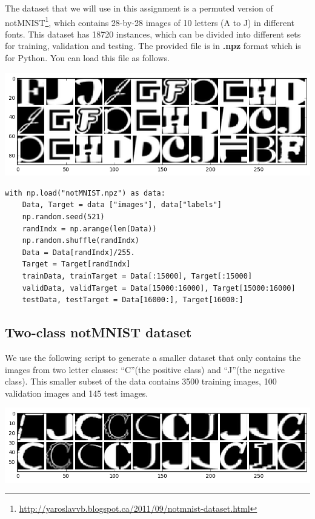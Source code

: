 \documentclass[12pt,letterpaper]{article}
\begin{document}
The dataset that we will use in this assignment is a permuted version of notMNIST\footnote{\url{http://yaroslavvb.blogspot.ca/2011/09/notmnist-dataset.html}}, which contains 28-by-28 images of 10 letters (A to J) in  different fonts. This dataset has 18720 instances, which can be divided into different sets for training, validation and testing. The provided file is in \textbf{.npz} format which is for Python. You can load this file as follows.

\includegraphics[scale=0.6]{multiclass.png}

\begin{verbatim}
with np.load("notMNIST.npz") as data:
    Data, Target = data ["images"], data["labels"]
    np.random.seed(521)
    randIndx = np.arange(len(Data))
    np.random.shuffle(randIndx)
    Data = Data[randIndx]/255.
    Target = Target[randIndx]
    trainData, trainTarget = Data[:15000], Target[:15000]
    validData, validTarget = Data[15000:16000], Target[15000:16000]
    testData, testTarget = Data[16000:], Target[16000:]
\end{verbatim}

\subsection*{Two-class notMNIST dataset}
We use the following script to generate a smaller dataset that only contains the images from two letter classes: ``C''(the positive class) and ``J''(the negative class). This smaller subset of the data contains 3500 training images, 100 validation images and 145 test images.

\includegraphics[scale=0.6]{binary.png}
\end{document}
